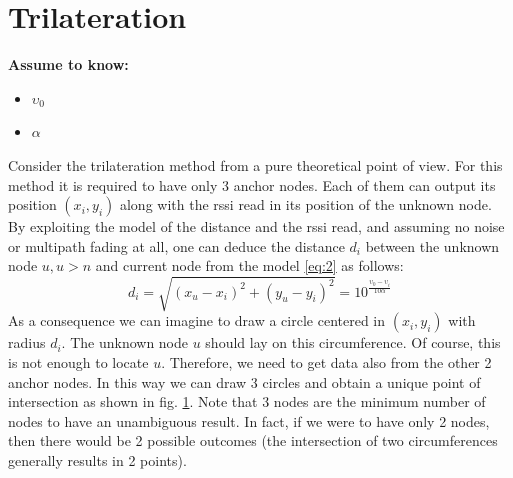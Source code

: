 \documentclass[12pt,twoside]{report}
\begin{document}
\clearpage
\section{Trilateration}
  \begin{center}
  \textbf{Assume to know:}
  \begin{itemize}
    \centering
    \item $\upsilon_0$
    \item $\alpha$
  \end{itemize}
  \end{center}
Consider the trilateration method from a pure theoretical point of view. For this method it is required to have only 3 anchor nodes. Each of them can output its position $(x_i,y_i)$ along with the rssi read in its position of the unknown node. By exploiting the model of the distance and the rssi read, and assuming no noise or multipath fading at all, one can deduce the distance $d_i$ between the unknown node $u, u>n$ and current node from the model \ref{eq:2} as follows:  
\begin{equation}
    d_i=\sqrt{(x_u-x_i)^2+(y_u-y_i)^2}=10^{\frac{\upsilon_0-\upsilon_i}{10\alpha}}   
    \label{eq:18}
\end{equation}
As a consequence we can imagine to draw a circle centered in $(x_i,y_i)$ with radius $d_i$. The unknown node $u$ should lay on this circumference. Of course, this is not enough to locate $u$. Therefore, we need to get data also from the other 2 anchor nodes. In this way we can draw 3 circles and obtain a unique point of intersection as shown in fig. \ref{fig:trilOK}. Note that 3 nodes are the minimum number of nodes to have an unambiguous result. In fact, if we were to have only 2 nodes, then there would be 2 possible outcomes (the intersection of two circumferences generally results in 2 points).
\begin{figure}
    \centering
    \caption{}
    \label{fig:trilOK}
\end{figure}
\end{document}
